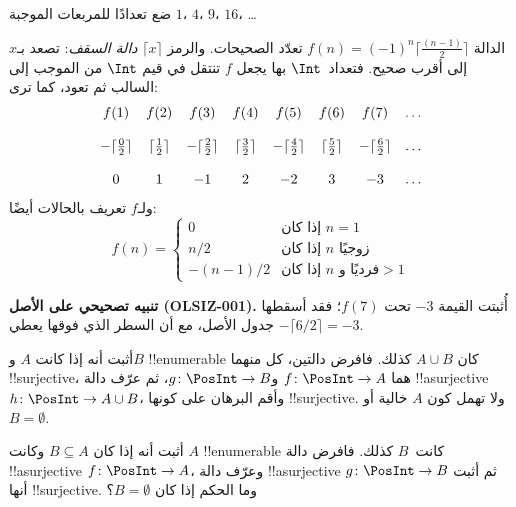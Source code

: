 \documentclass[../../../include/open-logic-section]{subfiles}
\begin{document}
\begin{prob}
ضع تعدادًا للمربعات الموجبة $1$، $4$، $9$، $16$، \dots
\end{prob}

\begin{ex}
الدالة $f(n) = (-1)^{n} \lceil \frac{(n-1)}{2}\rceil$ تعدّد
الصحيحات. والرمز $\lceil x \rceil$ \emph{دالة السقف}: تصعد بـ$x$
إلى أقرب صحيح. فتعداد~$\Int$ بها يجعل $f$ تنتقل في قيم $\Int$
من الموجب إلى السالب ثم تعود، كما ترى:
\[
\begin{array}{c c c c c c c c}
f(1) & f(2) & f(3) & f(4) & f(5) & f(6) & f(7) & \dots \\ \\
- \lceil \tfrac{0}{2} \rceil & \lceil \tfrac{1}{2}\rceil & - \lceil \tfrac{2}{2} \rceil & \lceil \tfrac{3}{2} \rceil & - \lceil \tfrac{4}{2} \rceil  & \lceil \tfrac{5}{2}
\rceil & - \lceil \tfrac{6}{2} \rceil & \dots \\ \\
0 & 1 & -1 & 2 & -2 & 3 & -3 & \dots
\end{array}
\]
ولـ$f$ تعريف بالحالات أيضًا:
\[
f(n) = \begin{cases}
  0 & \text{إذا كان $n = 1$}\\
  n/2 & \text{إذا كان $n$ زوجيًا}\\
  -(n-1)/2 & \text{إذا كان $n$ فرديًا و$>1$}
  \end{cases}
\]
\end{ex}

\begin{editorial}
\textbf{تنبيه تصحيحي على الأصل (OLSIZ-001).}
أُثبتت القيمة $-3$ تحت $f(7)$؛ فقد أسقطها جدول الأصل، مع أن
السطر الذي فوقها يعطي $-\lceil 6/2\rceil=-3$.
\end{editorial}

\begin{prob}
أثبت أنه إذا كانت $A$ و$B$ !!{enumerable} كان $A \cup B$ كذلك.
فافرض دالتين، كل منهما !!{surjective}، هما $f\colon \PosInt \to A$ و$g\colon \PosInt \to B$،
ثم عرّف دالة !!a{surjective}~$h\colon \PosInt \to A \cup B$،
وأقم البرهان على كونها !!{surjective}. ولا تهمل كون $A$ خالية
أو~$B = \emptyset$.
\end{prob}

\begin{prob}
أثبت أنه إذا كان $B \subseteq A$ وكانت $A$ !!{enumerable} كانت~$B$ كذلك.
فافرض دالة !!a{surjective} $f\colon \PosInt \to A$،
وعرّف دالة !!a{surjective} $g\colon \PosInt \to B$ ثم أثبت أنها
!!{surjective}. وما الحكم إذا كان $B = \emptyset$؟
\end{prob}
\end{document}
